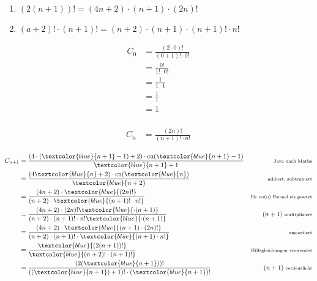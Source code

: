 \documentclass{lehramt-informatik-aufgabe}
\begin{document}
\begin{enumerate}
\begin{enumerate}

\item $(2(n + 1))! = (4n + 2) \cdot (n + 1) \cdot (2n)!$

\item $(a + 2)! \cdot (n+1)! = (n + 2) \cdot (n + 1) \cdot (n + 1)! \cdot n!$
\end{enumerate}

\begin{liAntwort}
%

\liInduktionAnfang

\begin{align*}
C_0
& = \frac{(2 \cdot 0)!}{(0 + 1)! \cdot 0!}\\
& = \frac{0!}{1! \cdot 0!}\\
& = \frac{1}{1 \cdot 1}\\
& = \frac{1}{1}\\
& = 1\\
\end{align*}

%

\liInduktionVoraussetzung

\begin{align*}
C_n
& = \frac{(2n)!}{(n + 1)! \cdot n!}
\end{align*}

\newpage

%

\liInduktionSchritt

\def\e#1{\scriptsize#1}

\def\et#1{\scriptsize\text{#1}}

\def\m#1{\textcolor{blue}{#1}}


\begin{align*}
C_{n+1}
& = \frac
  {(4 \cdot (\m{n + 1} - 1) + 2) \cdot \text{cn}(\m{n + 1} - 1)}
  {\m{n + 1} + 1}
  & \et{Java nach Mathe}\\
%
& = \frac
  {(4\m{n} + 2) \cdot \text{cn}(\m{n})}
  {\m{n + 2}}
  & \et{addiert, subtrahiert}\\
%
& = \frac
  {(4n + 2) \cdot \m{(2n)!}}
  {(n + 2) \cdot \m{(n + 1)! \cdot n!}}
  & \et{für cn(n) Formel eingesetzt}\\
%
& = \frac
  {(4n + 2) \cdot (2n)! \m{\cdot (n + 1)}}
  {(n + 2) \cdot (n + 1)! \cdot n! \m{\cdot (n + 1)}}
  & \e{(n + 1) \text{ multipliziert}} \\
%
& = \frac
  {(4n + 2) \cdot \m{(n + 1) \cdot (2n)!}}
  {(n + 2) \cdot (n + 1)! \cdot \m{(n + 1) \cdot n!}}
  & \et{umsortiert} \\
%
& = \frac
  {\m{(2(n + 1))!}}
  {\m{(n + 2)! \cdot (n + 1)!}}
  & \et{Hilfsgleichungen verwendet}\\
%
& = \frac
  {(2(\m{n + 1}))!}
  {((\m{n + 1}) + 1)! \cdot (\m{n + 1})!}
  & \e{(n + 1) \text{ verdeutlicht}}\\
\end{align*}


\end{liAntwort}
\end{enumerate}
\end{document}
